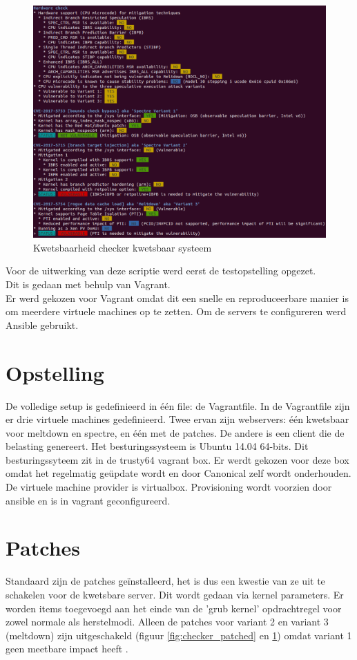 \begin{figure}
	\includegraphics[width=1.0\linewidth]{img/checker_vulnerable.png}
	\caption{Kwetsbaarheid checker kwetsbaar systeem}
	\label{fig:checker_vulnerable}
\end{figure}

Voor de uitwerking van deze scriptie werd eerst de testopstelling opgezet.\\
Dit is gedaan met behulp van Vagrant.\\
Er werd gekozen voor Vagrant omdat dit een snelle en reproduceerbare manier is om meerdere virtuele machines op te zetten. Om de servers te configureren werd Ansible gebruikt.

\section{Opstelling}
De volledige setup is gedefinieerd in één file: de Vagrantfile.
In de Vagrantfile zijn er drie virtuele machines gedefinieerd. Twee ervan zijn webservers: één kwetsbaar voor meltdown en spectre, en één met de patches. De andere is een client die de belasting genereert. Het besturingssysteem is Ubuntu 14.04 64-bits. Dit besturingssyteem zit in de trusty64 vagrant box. Er werdt gekozen voor deze box omdat het regelmatig geüpdate wordt en door Canonical zelf wordt onderhouden.\\
De virtuele machine provider is virtualbox. Provisioning wordt voorzien door ansible en is in vagrant geconfigureerd.

\section{Patches}
Standaard zijn de patches geïnstalleerd, het is dus een kwestie van ze uit te schakelen voor de kwetsbare server.
Dit wordt gedaan via kernel parameters. Er worden items toegevoegd aan het einde van de 'grub kernel' opdrachtregel voor zowel normale als herstelmodi.
Alleen de patches voor variant 2 en variant 3 (meltdown) zijn uitgeschakeld (figuur \ref{fig:checker_patched} en \ref{fig:checker_vulnerable}) omdat variant 1 geen meetbare impact heeft \parencite{Redhat2018a}.